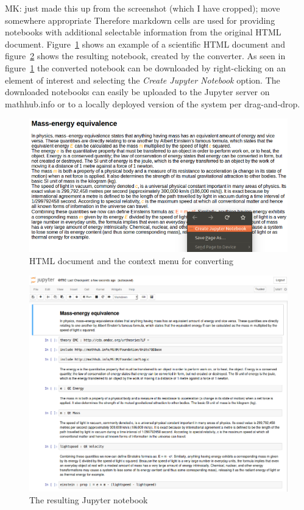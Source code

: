 \begin{newpart}{MK: just made this up from the screenshot (which I have cropped); move somewhere appropriate}
Therefore markdown cells are used for providing notebooks with additional selectable information from the original HTML document. Figure~\ref{fig:conversionHTML} shows an example of a scientific HTML document and  figure~\ref{fig:conversionNotebook} shows the resulting notebook, created by the converter. As seen in figure~\ref{fig:conversionHTML} the converted notebook can be downloaded by right-clicking on an element of interest and selecting the \textit{Create Jupyter Notebook} option. The downloaded notebooks can easily be uploaded to the Jupyter server on mathhub.info or to a locally deployed version of the system per drag-and-drop. 

\begin{figure}[ht]\centering
\includegraphics[width=12cm]{conversionHTML}
\caption{HTML document and the context menu for converting}
\label{fig:conversionHTML}
\end{figure}

\begin{figure}[ht]\centering
\includegraphics[width=12cm]{conversionNotebook}
\caption{The resulting Jupyter notebook}
\label{fig:conversionNotebook}
\end{figure}


\end{newpart}
